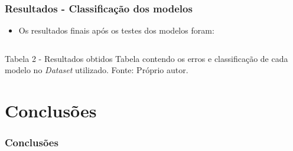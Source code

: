 \documentclass[aspectratio=169]{beamer}
\begin{document}
\begin{frame}[fragile] \frametitle{Resultados - Classificação dos modelos}
	\begin{itemize} 
		\item Os resultados finais após os testes dos modelos foram:
	\end{itemize}
	\begin{columns}[c]
		\begin{column}{0.6\linewidth} %
			\begin{table}[!htb]
			\end{table}
		\end{column}
	\end{columns}
	\begin{block}{Tabela 2 - Resultados obtidos}
		Tabela contendo os erros e classificação de cada modelo no \textit{Dataset} utilizado. \newline Fonte: Próprio autor.    
	\end{block}
\end{frame}

\section{Conclusões}

\begin{frame} \frametitle{Conclusões}
	
\end{frame}

\end{document}

